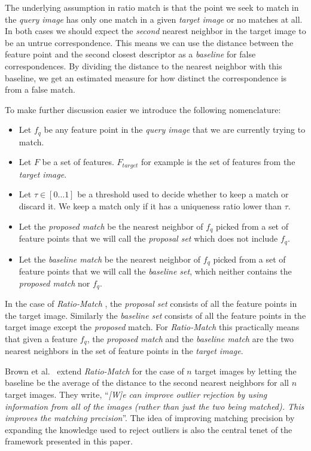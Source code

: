 \documentclass[10pt,journal,cspaper,compsoc]{IEEEtran}
\begin{document}
The underlying assumption in ratio match is that the point we seek to 
match in the \emph{query image} has only one match in a given 
\emph{target image} or no matches at all. In both cases we should expect 
the \emph{second} nearest neighbor in the target image to be an 
untrue correspondence.  This means we can use the distance between the 
feature point and the second closest descriptor as a \emph{baseline} for 
false correspondences. By dividing the distance to the nearest neighbor 
with this baseline, we get an estimated measure for how distinct the 
correspondence is from a false match.  

To make further discussion easier we introduce the following 
nomenclature:
\begin{itemize}
\item{Let $f_q$ be any feature point in the \emph{query image} that we 
    are currently trying to match}.
\item{Let $F$ be a set of features. $F_{target}$ for example is the set 
    of features from the \emph{target image}}.
\item{Let $\tau \in [0 \ldots 1]$ be a threshold used to decide whether 
	to keep a match or discard it. We keep a match only if it has a 
uniqueness ratio lower than $\tau$}.
\item{Let the \emph{proposed match} be the nearest neighbor of $f_q$
    picked from a set of feature points that we will call the 
\emph{proposal set} which does not include $f_q$}.
\item{Let the \emph{baseline match} be the nearest neighbor of $f_q$ 
    picked from a set of feature points that we will call the 
\emph{baseline set}, which neither contains the \emph{proposed match} nor 
$f_q$}.
\end{itemize}

In the case of \emph{Ratio-Match} \cite{lowe2004sift}, the \emph{proposal 
set} consists of all the feature points in the target image.  Similarly 
the \emph{baseline set} consists of all the feature points in the target 
image except the \emph{proposed} match. For \emph{Ratio-Match} this 
practically means that given a feature $f_q$, the \emph{proposed match} 
and the \emph{baseline match} are the two nearest neighbors in the set 
of feature points in the \emph{target image}.

Brown et al.\ \cite{brown2005multi} extend \emph{Ratio-Match} for the case of $n$ target 
images by letting the baseline be the average of the distance to the 
second nearest neighbors for all $n$ target images.  They write, ``\emph{[W]e can improve outlier rejection by using information from all of the images (rather 
than just the two being matched). This improves the matching precision}''.  The idea of improving matching precision by expanding the 
knowledge used to reject outliers is also the central tenet of the framework presented in this paper.
\end{document}
